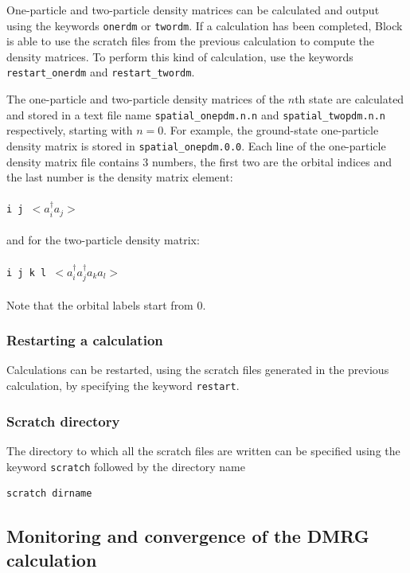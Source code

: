 \documentclass[letterpaper,12pt,aps, pra]{revtex4-1}
\begin{document}
One-particle and two-particle density matrices can be calculated and output
using the keywords \texttt{onerdm} or \texttt{twordm}.  If a calculation has
been completed, Block is able to use the scratch files from the previous
calculation to compute the density matrices. To perform this kind of
calculation,  use the keywords \texttt{restart\_onerdm} and
\texttt{restart\_twordm}.

The one-particle and two-particle density matrices of the $n$th state are
calculated and stored in a text file name \texttt{spatial\_onepdm.n.n} and
\texttt{spatial\_twopdm.n.n} respectively, starting with $n=0$. For example,
the ground-state one-particle density matrix is stored in
\texttt{spatial\_onepdm.0.0}.  Each line of the one-particle density matrix
file contains 3 numbers, the first two are the orbital indices and the last
number is the density matrix element:
\\ \texttt{ \\i j $<a_i^\dag a_j>$\\ }
\\and for the two-particle density matrix:
\\ \texttt{ \\i j k l $<a_i^\dag
a_j^\dag a_k a_l>$\\ } 
\\Note that the orbital labels start from 0.

\subsubsection{Restarting a calculation}
Calculations can be restarted, using the scratch files generated in the
previous calculation, by specifying the keyword \texttt{restart}.

\subsubsection{Scratch directory}
The directory to which all the scratch files are written can be specified using
the keyword \texttt{scratch}  followed by the directory name
\begin{verbatim}
scratch dirname
\end{verbatim}

\subsection{Monitoring and convergence of the DMRG calculation}

\label{sec:dmrg_convergence}
\end{document}
